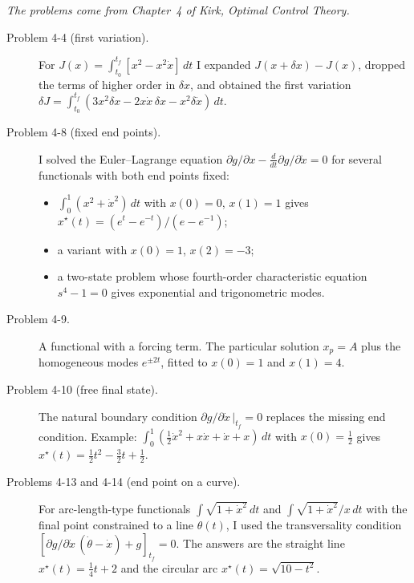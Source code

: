 


\noindent\textit{The problems come from Chapter~4 of Kirk, \emph{Optimal Control Theory}.}

\begin{description}
  \item[Problem 4-4 (first variation).] For $J(x)=\int_{t_0}^{t_f}[x^2-x^2\dot x]\,dt$ I expanded $J(x+\delta x)-J(x)$, dropped the terms of higher order in $\delta x$, and obtained the first variation $\delta J=\int_{t_0}^{t_f}(3x^2\delta x-2x\dot x\,\delta x - x^2\delta\dot x)\,dt$.
  \item[Problem 4-8 (fixed end points).] I solved the Euler--Lagrange equation $\partial g/\partial x - \tfrac{d}{dt}\partial g/\partial\dot x=0$ for several functionals with both end points fixed:
    \begin{itemize}
      \item $\int_0^1(x^2+\dot x^2)\,dt$ with $x(0)=0$, $x(1)=1$ gives $x^\star(t)=(e^t-e^{-t})/(e-e^{-1})$;
      \item a variant with $x(0)=1$, $x(2)=-3$;
      \item a two-state problem whose fourth-order characteristic equation $s^4-1=0$ gives exponential and trigonometric modes.
    \end{itemize}
  \item[Problem 4-9.] A functional with a forcing term. The particular solution $x_p=A$ plus the homogeneous modes $e^{\pm 2t}$, fitted to $x(0)=1$ and $x(1)=4$.
  \item[Problem 4-10 (free final state).] The natural boundary condition $\partial g/\partial\dot x\,|_{t_f}=0$ replaces the missing end condition. Example: $\int_0^1(\tfrac12\dot x^2+x\dot x+\dot x+x)\,dt$ with $x(0)=\tfrac12$ gives $x^\star(t)=\tfrac12t^2-\tfrac32t+\tfrac12$.
  \item[Problems 4-13 and 4-14 (end point on a curve).] For arc-length-type functionals $\int\sqrt{1+\dot x^2}\,dt$ and $\int\sqrt{1+\dot x^2}/x\,dt$ with the final point constrained to a line $\theta(t)$, I used the transversality condition $[\partial g/\partial\dot x\,(\dot\theta-\dot x)+g]_{t_f}=0$. The answers are the straight line $x^\star(t)=\tfrac14t+2$ and the circular arc $x^\star(t)=\sqrt{10-t^2}$.
\end{description}

